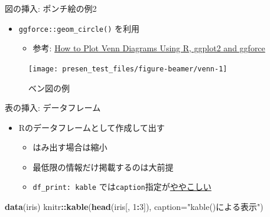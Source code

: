 \documentclass[
  12pt,
  ignorenonframetext,
]{beamer}
\newenvironment{Shaded}{\begin{snugshade}}{\end{snugshade}}
\newcommand{\DataTypeTok}[1]{\textcolor[rgb]{0.13,0.29,0.53}{#1}}
\newcommand{\DecValTok}[1]{\textcolor[rgb]{0.00,0.00,0.81}{#1}}
\newcommand{\KeywordTok}[1]{\textcolor[rgb]{0.13,0.29,0.53}{\textbf{#1}}}
\newcommand{\NormalTok}[1]{#1}
\newcommand{\OperatorTok}[1]{\textcolor[rgb]{0.81,0.36,0.00}{\textbf{#1}}}
\newcommand{\StringTok}[1]{\textcolor[rgb]{0.31,0.60,0.02}{#1}}
\providecommand{\tightlist}{%
  \setlength{\itemsep}{0pt}\setlength{\parskip}{0pt}}
\begin{document}
\begin{frame}[fragile]{図の挿入: ポンチ絵の例2}
\protect\hypertarget{ux56f3ux306eux633fux5165-ux30ddux30f3ux30c1ux7d75ux306eux4f8b2}{}

\begin{itemize}
\tightlist
\item
  \texttt{ggforce::geom\_circle()} を利用

  \begin{itemize}
  \tightlist
  \item
    参考:
    \href{https://scriptsandstatistics.wordpress.com/2018/04/26/how-to-plot-venn-diagrams-using-r-ggplot2-and-ggforce/}{How
    to Plot Venn Diagrams Using R, ggplot2 and ggforce}
  \end{itemize}
\end{itemize}

\begin{figure}

{\centering \texttt{[image: presen\_test\_files/figure-beamer/venn-1]} 

}

\caption{ベン図の例}\label{fig:venn}
\end{figure}

\end{frame}

\begin{frame}[fragile]{表の挿入: データフレーム}
\protect\hypertarget{ux8868ux306eux633fux5165-ux30c7ux30fcux30bfux30d5ux30ecux30fcux30e0}{}

\begin{itemize}
\tightlist
\item
  Rのデータフレームとして作成して出す

  \begin{itemize}
  \tightlist
  \item
    はみ出す場合は縮小
  \item
    最低限の情報だけ掲載するのは大前提
  \item
    \texttt{df\_print:\ kable}
    では\texttt{caption}指定が\href{https://stackoverflow.com/questions/48410861/how-to-add-table-caption-using-df-print}{ややこしい}
  \end{itemize}
\end{itemize}

\begin{Shaded}
\begin{Highlighting}[]
\KeywordTok{data}\NormalTok{(iris)}
\NormalTok{knitr}\OperatorTok{::}\KeywordTok{kable}\NormalTok{(}\KeywordTok{head}\NormalTok{(iris[, }\DecValTok{1}\OperatorTok{:}\DecValTok{3}\NormalTok{]),}
             \DataTypeTok{caption=}\StringTok{"kable()による表示"}\NormalTok{)}
\end{Highlighting}
\end{Shaded}

\end{frame}
\end{document}
